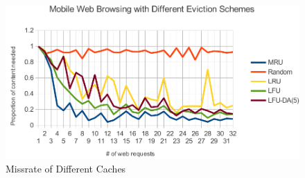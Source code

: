 \begin{figure}[h]
\centering \includegraphics[width=\columnwidth]{images/caches.pdf}
\caption{Missrate of Different Caches}
\end{figure}
